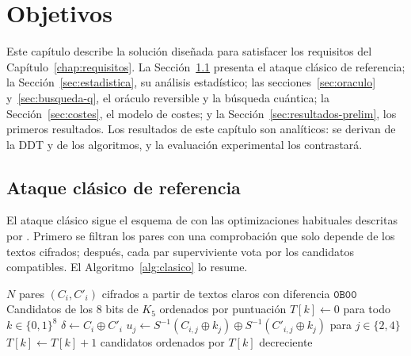 \chapter{Objetivos}
\label{chap:solucion}

Este capítulo describe la solución diseñada para satisfacer los requisitos del Capítulo~\ref{chap:requisitos}. La Sección~\ref{sec:clasico} presenta el ataque clásico de referencia; la Sección~\ref{sec:estadistica}, su análisis estadístico; las secciones~\ref{sec:oraculo} y~\ref{sec:busqueda-q}, el oráculo reversible y la búsqueda cuántica; la Sección~\ref{sec:costes}, el modelo de costes; y la Sección~\ref{sec:resultados-prelim}, los primeros resultados. Los resultados de este capítulo son analíticos: se derivan de la DDT y de los algoritmos, y la evaluación experimental los contrastará.

\section{Ataque clásico de referencia}
\label{sec:clasico}

El ataque clásico sigue el esquema de \citet{biham1991} con las optimizaciones habituales descritas por \citet{heys2002}. Primero se filtran los pares con una comprobación que solo depende de los textos cifrados; después, cada par superviviente vota por los candidatos compatibles. El Algoritmo~\ref{alg:clasico} lo resume.

\begin{algorithm}[H]
\caption{Ataque diferencial clásico de última ronda}
\label{alg:clasico}
\begin{algorithmic}[1]
\Require \(N\) pares \((C_i,C'_i)\) cifrados a partir de textos claros con diferencia \(\texttt{0B00}\)
\Ensure Candidatos de los 8 bits de \(K_5\) ordenados por puntuación
\State \(T[k]\gets 0\) para todo \(k\in\{0,1\}^8\)
 \State \(\delta\gets C_i\oplus C'_i\)
  
   \State \(u_j\gets S^{-1}(C_{i,j}\oplus k_j)\oplus S^{-1}(C'_{i,j}\oplus k_j)\) para \(j\in\{2,4\}\)
    \(T[k]\gets T[k]+1\) \EndIf
  \EndFor
 \EndIf
\EndFor
\State \Return candidatos ordenados por \(T[k]\) decreciente
\end{algorithmic}
\end{algorithm}

